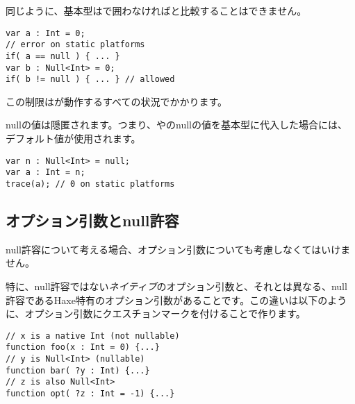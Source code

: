 同じように、基本型はで囲わなければと比較することはできません。

\begin{lstlisting}
var a : Int = 0;
// error on static platforms
if( a == null ) { ... }
var b : Null<Int> = 0;
if( b != null ) { ... } // allowed
\end{lstlisting}

この制限はが動作するすべての状況でかかります。


nullの値は隠匿されます。つまり、やのnullの値を基本型に代入した場合には、デフォルト値が使用されます。

\begin{lstlisting}
var n : Null<Int> = null;
var a : Int = n;
trace(a); // 0 on static platforms
\end{lstlisting}



\subsection{オプション引数とnull許容}
\label{types-nullability-optional-arguments}

null許容について考える場合、オプション引数についても考慮しなくてはいけません。

特に、null許容ではない\emph{ネイティブ}のオプション引数と、それとは異なる、null許容であるHaxe特有のオプション引数があることです。この違いは以下のように、オプション引数にクエスチョンマークを付けることで作ります。

\begin{lstlisting}
// x is a native Int (not nullable)
function foo(x : Int = 0) {...}
// y is Null<Int> (nullable)
function bar( ?y : Int) {...}
// z is also Null<Int>
function opt( ?z : Int = -1) {...}
\end{lstlisting}

